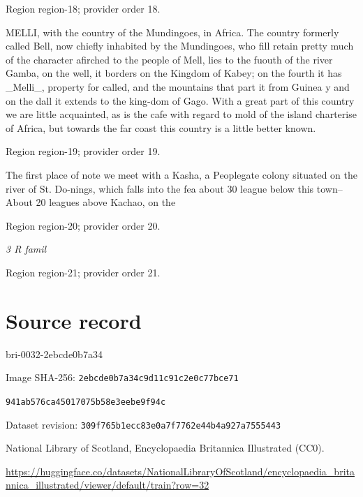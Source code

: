 \documentclass[11pt]{article}
\begin{document}
{\scriptsize\color{gray} Region region-18; provider order 18.\par}
\medskip

MELLI, with the country of the Mundingoes, in Africa. The country formerly called Bell, now chiefly inhabited by the Mundingoes, who fill retain pretty much of the character afirched to the people of Mell, lies to the fuouth of the river Gamba, on the well, it borders on the Kingdom of Kabey; on the fourth it has \_Melli\_, property for called, and the mountains that part it from Guinea y and on the dall it extends to the king-dom of Gago. With a great part of this country we are little acquainted, as is the cafe with regard to mold of the island charterise of Africa, but towards the far coast this country is a little better known.
\par

{\scriptsize\color{gray} Region region-19; provider order 19.\par}
\medskip

The first place of note we meet with a Kasha, a Peoplegate colony situated on the river of St. Do-nings, which falls into the fea about 30 league below this town--About 20 leagues above Kachao, on the
\par

{\scriptsize\color{gray} Region region-20; provider order 20.\par}
\medskip

{\small\itshape 3 R famil\par}

{\scriptsize\color{gray} Region region-21; provider order 21.\par}
\medskip
\newpage\section*{Source record}
bri-0032-2ebcde0b7a34\par
Image SHA-256: \texttt{2ebcde0b7a34c9d11c91c2e0c77bce71}\par\texttt{941ab576ca45017075b58e3eebe9f94c}\par
Dataset revision: \texttt{309f765b1ecc83e0a7f7}\texttt{762e44b4a927a7555443}\par
National Library of Scotland, Encyclopaedia Britannica Illustrated (CC0).\par
\url{https://huggingface.co/datasets/NationalLibraryOfScotland/encyclopaedia_britannica_illustrated/viewer/default/train?row=32}
\end{document}
